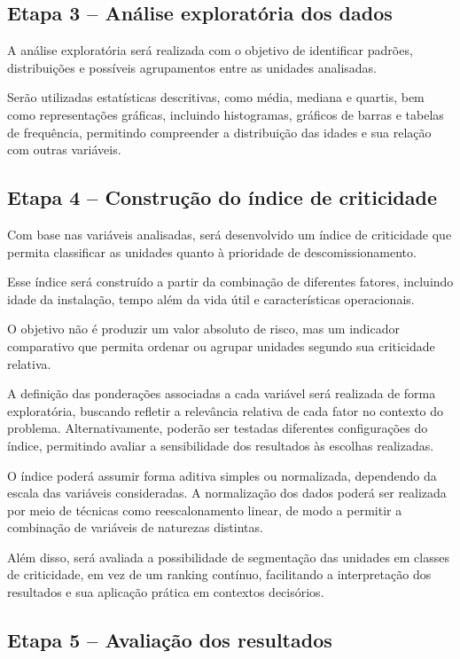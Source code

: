\documentclass[a4paper,12pt]{article}
\begin{document}
\subsection*{Etapa 3 – Análise exploratória dos dados}

A análise exploratória será realizada com o objetivo de identificar padrões, distribuições e possíveis agrupamentos entre as unidades analisadas.

Serão utilizadas estatísticas descritivas, como média, mediana e quartis, bem como representações gráficas, incluindo histogramas, gráficos de barras e tabelas de frequência, permitindo compreender a distribuição das idades e sua relação com outras variáveis.

\subsection*{Etapa 4 – Construção do índice de criticidade}

Com base nas variáveis analisadas, será desenvolvido um índice de criticidade que permita classificar as unidades quanto à prioridade de descomissionamento.

Esse índice será construído a partir da combinação de diferentes fatores, incluindo idade da instalação, tempo além da vida útil e características operacionais.

O objetivo não é produzir um valor absoluto de risco, mas um indicador comparativo que permita ordenar ou agrupar unidades segundo sua criticidade relativa.

A definição das ponderações associadas a cada variável será realizada de forma exploratória, buscando refletir a relevância relativa de cada fator no contexto do problema. Alternativamente, poderão ser testadas diferentes configurações do índice, permitindo avaliar a sensibilidade dos resultados às escolhas realizadas.

O índice poderá assumir forma aditiva simples ou normalizada, dependendo da escala das variáveis consideradas. A normalização dos dados poderá ser realizada por meio de técnicas como reescalonamento linear, de modo a permitir a combinação de variáveis de naturezas distintas.

Além disso, será avaliada a possibilidade de segmentação das unidades em classes de criticidade, em vez de um ranking contínuo, facilitando a interpretação dos resultados e sua aplicação prática em contextos decisórios.

\subsection*{Etapa 5 – Avaliação dos resultados}
\end{document}
